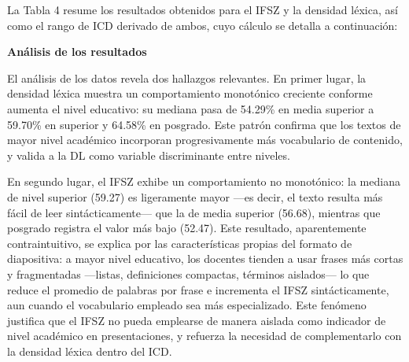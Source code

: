 \documentclass[11pt]{article}
\begin{document}
La Tabla 4 resume los resultados obtenidos para el IFSZ y la densidad léxica, así como el rango de ICD derivado de ambos, cuyo cálculo se detalla a continuación:

\begin{table}[H]
    \centering
    \scriptsize
    \caption{Resultados de calibración del IFSZ y la DL por nivel educativo.}
\end{table}
\textbf{Análisis de los resultados}

El análisis de los datos revela dos hallazgos relevantes. En primer lugar, la densidad léxica muestra un comportamiento monotónico creciente conforme aumenta el nivel educativo: su mediana pasa de 54.29\% en media superior a 59.70\% en superior y 64.58\% en posgrado. Este patrón confirma que los textos de mayor nivel académico incorporan progresivamente más vocabulario de contenido, y valida a la DL como variable discriminante entre niveles.

En segundo lugar, el IFSZ exhibe un comportamiento no monotónico: la mediana de nivel superior (59.27) es ligeramente mayor —es decir, el texto resulta más fácil de leer sintácticamente— que la de media superior (56.68), mientras que posgrado registra el valor más bajo (52.47). Este resultado, aparentemente contraintuitivo, se explica por las características propias del formato de diapositiva: a mayor nivel educativo, los docentes tienden a usar frases más cortas y fragmentadas —listas, definiciones compactas, términos aislados— lo que reduce el promedio de palabras por frase e incrementa el IFSZ sintácticamente, aun cuando el vocabulario empleado sea más especializado. Este fenómeno justifica que el IFSZ no pueda emplearse de manera aislada como indicador de nivel académico en presentaciones, y refuerza la necesidad de complementarlo con la densidad léxica dentro del ICD.
\end{document}
